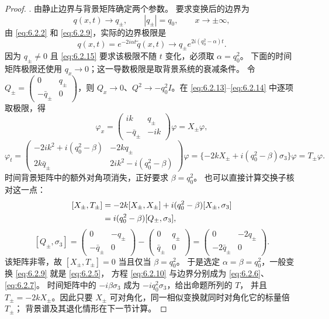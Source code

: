 \documentclass[lang=cn,scheme=chinese,mode=simple,device=normal,color=blue,
math=cm,thmcnt=section,12pt]{elegantbook}
\newcommand{\eqq}[2]{\tag{#1}\label{eq:#1}#2}
\begin{document}
\begin{proof}
    {. 由静止边界与背景矩阵确定两个参数。}
    要求变换后的边界为
    \begin{equation}\eqq{6.2.15}{q(x,t)\to q_\pm,\qquad |q_\pm|=q_0,\qquad x\to\pm\infty,}\end{equation}
    由 \eqref{eq:6.2.2} 和 \eqref{eq:6.2.9}，实际的边界极限是
    \[
        q(x,t)=e^{-2i\alpha t}\widetilde q(x,t)
        \longrightarrow q_\pm e^{2i(q_0^2-\alpha)t}.
    \]
    因为 $q_\pm\ne0$ 且 \eqref{eq:6.2.15} 要求该极限不随 $t$ 变化，必须取 $\alpha=q_0^2$。
    下面的时间矩阵极限还使用 $q_x\to0$；这一导数极限是取背景系统的衰减条件。
    令 $Q_\pm=\begin{pmatrix}0&q_\pm\\-\bar q_\pm&0\end{pmatrix}$，则
    $Q_x\to0$、$Q^2\to-q_0^2I$。在 \eqref{eq:6.2.13}--\eqref{eq:6.2.14} 中逐项取极限，得
    \begin{equation}\eqq{6.2.16}{\varphi_x=\begin{pmatrix}ik&q_\pm\\-\bar q_\pm&-ik\end{pmatrix}\varphi=X_\pm\varphi,}\end{equation}
    \begin{equation}\eqq{6.2.17}{\varphi_t=\begin{pmatrix}-2ik^2+i(q_0^2-\beta)&-2kq_\pm\\2k\bar q_\pm&2ik^2-i(q_0^2-\beta)\end{pmatrix}\varphi =\{-2kX_\pm+i(q_0^2-\beta)\sigma_3\}\varphi=T_\pm\varphi.}\end{equation}
    时间背景矩阵中的额外对角项消失，正好要求 $\beta=q_0^2$。
    也可以直接计算交换子核对这一点：
    \[
        \begin{aligned}
            \relax[X_\pm,T_\pm]
             & =-2k[X_\pm,X_\pm]+i(q_0^2-\beta)[X_\pm,\sigma_3] \\
             & =i(q_0^2-\beta)[Q_\pm,\sigma_3],
        \end{aligned}
    \]
    \[
        [Q_\pm,\sigma_3]
        =\begin{pmatrix}0&-q_\pm\\-\bar q_\pm&0\end{pmatrix}
        -\begin{pmatrix}0&q_\pm\\\bar q_\pm&0\end{pmatrix}
        =\begin{pmatrix}0&-2q_\pm\\-2\bar q_\pm&0\end{pmatrix}.
    \]
    该矩阵非零，故 $[X_\pm,T_\pm]=0$ 当且仅当 $\beta=q_0^2$。
    于是选定 $\alpha=\beta=q_0^2$，一般变换 \eqref{eq:6.2.9} 就是 \eqref{eq:6.2.5}，
    方程 \eqref{eq:6.2.10} 与边界分别成为 \eqref{eq:6.2.6}、\eqref{eq:6.2.7}。
    时间矩阵中的 $-i\beta\sigma_3$ 成为 $-iq_0^2\sigma_3$，给出命题所列的 $T$，
    并且 $T_\pm=-2kX_\pm$。因此只要 $X_\pm$ 可对角化，同一相似变换就同时对角化它的标量倍 $T_\pm$；
    背景谱及其退化情形在下一节计算。


\end{proof}
\end{document}
